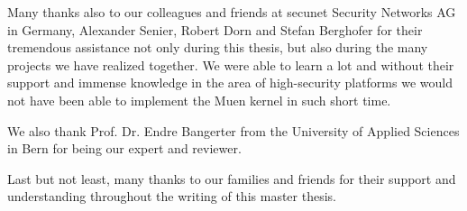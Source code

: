 \documentclass[a4paper,twoside]{report}
\begin{document}
Many thanks also to our colleagues and friends at secunet Security Networks AG
in Germany, Alexander Senier, Robert Dorn and Stefan Berghofer for their
tremendous assistance not only during this thesis, but also during the many
projects we have realized together. We were able to learn a lot and without
their support and immense knowledge in the area of high-security platforms we
would not have been able to implement the Muen kernel in such short time.

We also thank Prof. Dr. Endre Bangerter from the University of Applied Sciences
in Bern for being our expert and reviewer.

Last but not least, many thanks to our families and friends for their support
and understanding throughout the writing of this master thesis.

\tableofcontents
\listoffigures
\listoftables
\lstlistoflistings








\printindex{}



\end{document}
